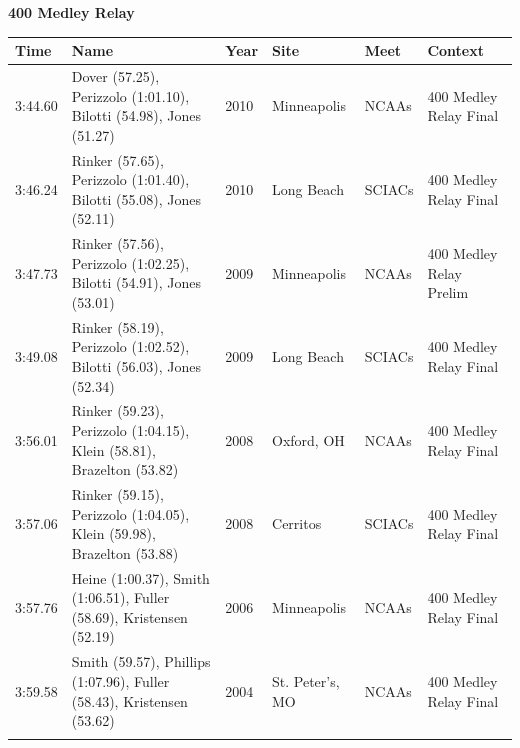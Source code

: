 \vspace{1.2em}
\noindent\begin{minipage}[t]{0.98\textwidth}
\centering
\textbf{\textcolor{teamprimary}{400 Medley Relay}}\par
\vspace{0.5em}
\centering
\small
\renewcommand{\arraystretch}{1.0}
\setlength{\tabcolsep}{4pt}
\begin{tabular}{@{}p{2.0cm}p{3.2cm}p{1.2cm}p{2.0cm}p{2.0cm}p{2.5cm}@{}}
\toprule
\textbf{Time} & \textbf{Name} & \textbf{Year} & \textbf{Site} & \textbf{Meet} & \textbf{Context} \\
\midrule
3:44.60 & Dover (57.25), Perizzolo (1:01.10), Bilotti (54.98), Jones (51.27) & 2010 & Minneapolis & NCAAs & 400 Medley Relay Final \\
3:46.24 & Rinker (57.65), Perizzolo (1:01.40), Bilotti (55.08), Jones (52.11) & 2010 & Long Beach & SCIACs & 400 Medley Relay Final \\
3:47.73 & Rinker (57.56), Perizzolo (1:02.25), Bilotti (54.91), Jones (53.01) & 2009 & Minneapolis & NCAAs & 400 Medley Relay Prelim \\
3:49.08 & Rinker (58.19), Perizzolo (1:02.52), Bilotti (56.03), Jones (52.34) & 2009 & Long Beach & SCIACs & 400 Medley Relay Final \\
3:56.01 & Rinker (59.23), Perizzolo (1:04.15), Klein (58.81), Brazelton (53.82) & 2008 & Oxford, OH & NCAAs & 400 Medley Relay Final \\
3:57.06 & Rinker (59.15), Perizzolo (1:04.05), Klein (59.98), Brazelton (53.88) & 2008 & Cerritos & SCIACs & 400 Medley Relay Final \\
3:57.76 & Heine (1:00.37), Smith (1:06.51), Fuller (58.69), Kristensen (52.19) & 2006 & Minneapolis & NCAAs & 400 Medley Relay Final \\
3:59.58 & Smith (59.57), Phillips (1:07.96), Fuller (58.43), Kristensen (53.62) & 2004 & St. Peter's, MO & NCAAs & 400 Medley Relay Final \\
\bottomrule
\vspace{0.5em}
\end{tabular}
\end{minipage}
\clearpage
